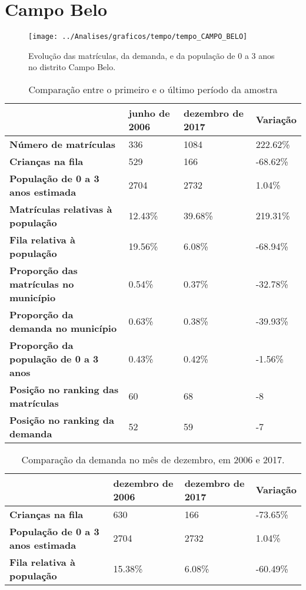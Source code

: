 \section{Campo Belo}
\begin{figure}[H]
\centering
\texttt{[image: ../Analises/graficos/tempo/tempo\_CAMPO\_BELO]}
\caption{Evolução das matrículas, da demanda, e da população de 0 a 3 anos no distrito Campo Belo.}
\end{figure}
\begin{table}[H]
\begin{tabular}{|l|l|l|l|}
\hline
\textbf{}                                      & \textbf{junho de 2006}       & \textbf{dezembro de 2017}    & \textbf{Variação} \\ \hline
\textbf{Número de matrículas}                  & 336 & 1084 & 222.62\% \\ \hline
\textbf{Crianças na fila}                      & 529 & 166 & -68.62\% \\ \hline
\textbf{População de 0 a 3 anos estimada}      & 2704 & 2732 & 1.04\% \\ \hline
\textbf{Matrículas relativas à população}      & 12.43\% & 39.68\% & 219.31\% \\ \hline
\textbf{Fila relativa à população}             & 19.56\% & 6.08\% & -68.94\% \\ \hline
\textbf{Proporção das matrículas no município} & 0.54\% & 0.37\% & -32.78\% \\ \hline
\textbf{Proporção da demanda no município}     & 0.63\% & 0.38\% & -39.93\% \\ \hline
\textbf{Proporção da população de 0 a 3 anos}  & 0.43\% & 0.42\% & -1.56\% \\ \hline
\textbf{Posição no ranking das matrículas}     & 60 & 68 & -8 \\ \hline
\textbf{Posição no ranking da demanda}         & 52 & 59 & -7 \\ \hline
\end{tabular}
\caption{Comparação entre o primeiro e o último período da amostra}
\end{table}
\begin{table}[H]
\begin{tabular}{|l|l|l|l|}
\hline
\textbf{}                                 & \textbf{dezembro de 2006} & \textbf{dezembro de 2017} & \textbf{Variação} \\ \hline
\textbf{Crianças na fila}                      & 630 & 166 & -73.65\% \\ \hline
\textbf{População de 0 a 3 anos estimada}      & 2704 & 2732 & 1.04\% \\ \hline
\textbf{Fila relativa à população}             & 15.38\% & 6.08\% & -60.49\% \\ \hline
\end{tabular}
\caption{Comparação da demanda no mês de dezembro, em 2006 e 2017.}
\end{table}
